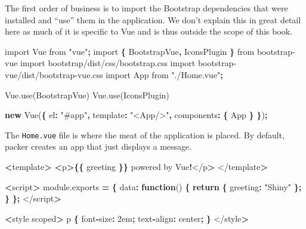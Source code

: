 \documentclass[
]{krantz}
\makeatletter
\newenvironment{Shaded}{\begin{snugshade}}{\end{snugshade}}
\newcommand{\AttributeTok}[1]{\textcolor[rgb]{0.61,0.61,0.61}{#1}}
\newcommand{\ControlFlowTok}[1]{\textcolor[rgb]{0.27,0.27,0.27}{\textbf{#1}}}
\newcommand{\DataTypeTok}[1]{\textcolor[rgb]{0.27,0.27,0.27}{#1}}
\newcommand{\ImportTok}[1]{#1}
\newcommand{\KeywordTok}[1]{\textcolor[rgb]{0.27,0.27,0.27}{\textbf{#1}}}
\newcommand{\NormalTok}[1]{#1}
\newcommand{\OperatorTok}[1]{\textcolor[rgb]{0.43,0.43,0.43}{\textbf{#1}}}
\newcommand{\StringTok}[1]{\textcolor[rgb]{0.5,0.5,0.5}{#1}}
\newcommand{\VariableTok}[1]{\textcolor[rgb]{0,0,0}{#1}}
\newenvironment{kframe}{%
\medskip{}
\setlength{\fboxsep}{.8em}
 \def\at@end@of@kframe{}%
 \ifinner\ifhmode%
  \def\at@end@of@kframe{\end{minipage}}%
  \begin{minipage}{\columnwidth}%
 \fi\fi%
 \def\FrameCommand##1{\hskip\@totalleftmargin \hskip-\fboxsep
 \colorbox{shadecolor}{##1}\hskip-\fboxsep
     \hskip-\linewidth \hskip-\@totalleftmargin \hskip\columnwidth}%
 \MakeFramed {\advance\hsize-\width
   \@totalleftmargin\z@ \linewidth\hsize
   \@setminipage}}%
 {\par\unskip\endMakeFramed%
 \at@end@of@kframe}
\renewenvironment{Shaded}{\begin{kframe}}{\end{kframe}}
\makeatother
\begin{document}
The first order of business is to import the Bootstrap dependencies that were installed and ``use'' them in the application. We don't explain this in great detail here as much of it is specific to Vue and is thus outside the scope of this book.

\begin{Shaded}
\begin{Highlighting}[]
\ImportTok{import}\NormalTok{ Vue }\ImportTok{from} \StringTok{"vue"}\OperatorTok{;}
\ImportTok{import} \OperatorTok{\{}\NormalTok{ BootstrapVue}\OperatorTok{,}\NormalTok{ IconsPlugin }\OperatorTok{\}} \ImportTok{from} \StringTok{\textquotesingle{}bootstrap{-}vue\textquotesingle{}}
\ImportTok{import} \StringTok{\textquotesingle{}bootstrap/dist/css/bootstrap.css\textquotesingle{}}
\ImportTok{import} \StringTok{\textquotesingle{}bootstrap{-}vue/dist/bootstrap{-}vue.css\textquotesingle{}}
\ImportTok{import}\NormalTok{ App }\ImportTok{from} \StringTok{"./Home.vue"}\OperatorTok{;}

\VariableTok{Vue}\NormalTok{.}\AttributeTok{use}\NormalTok{(BootstrapVue)}
\VariableTok{Vue}\NormalTok{.}\AttributeTok{use}\NormalTok{(IconsPlugin)}

\KeywordTok{new} \AttributeTok{Vue}\NormalTok{(}\OperatorTok{\{}
  \DataTypeTok{el}\OperatorTok{:} \StringTok{"\#app"}\OperatorTok{,}
  \DataTypeTok{template}\OperatorTok{:} \StringTok{"<App/>"}\OperatorTok{,}
  \DataTypeTok{components}\OperatorTok{:} \OperatorTok{\{}\NormalTok{ App }\OperatorTok{\}}
\OperatorTok{\}}\NormalTok{)}\OperatorTok{;}
\end{Highlighting}
\end{Shaded}

The \texttt{Home.vue} file is where the meat of the application is placed. By default, packer creates an app that just displays a message.

\begin{Shaded}
\begin{Highlighting}[]
\OperatorTok{<}\NormalTok{template}\OperatorTok{>}
  \OperatorTok{<}\NormalTok{p}\OperatorTok{>\{\{}\NormalTok{ greeting }\OperatorTok{\}\}}\NormalTok{ powered by Vue}\OperatorTok{!}\NormalTok{</p}\OperatorTok{>}
\NormalTok{</template}\OperatorTok{>}

\OperatorTok{<}\NormalTok{script}\OperatorTok{>}
\VariableTok{module}\NormalTok{.}\AttributeTok{exports} \OperatorTok{=} \OperatorTok{\{}
  \DataTypeTok{data}\OperatorTok{:} \KeywordTok{function}\NormalTok{() }\OperatorTok{\{}
    \ControlFlowTok{return} \OperatorTok{\{}
      \DataTypeTok{greeting}\OperatorTok{:} \StringTok{"Shiny"}
    \OperatorTok{\};}
  \OperatorTok{\}}
\OperatorTok{\};}
\NormalTok{</script}\OperatorTok{>}

\OperatorTok{<}\NormalTok{style scoped}\OperatorTok{>}
\NormalTok{p }\OperatorTok{\{}
\NormalTok{  font}\OperatorTok{{-}}\DataTypeTok{size}\OperatorTok{:}\NormalTok{ 2em}\OperatorTok{;}
\NormalTok{  text}\OperatorTok{{-}}\DataTypeTok{align}\OperatorTok{:}\NormalTok{ center}\OperatorTok{;}
\OperatorTok{\}}
\NormalTok{</style}\OperatorTok{>}
\end{Highlighting}
\end{Shaded}
\end{document}
